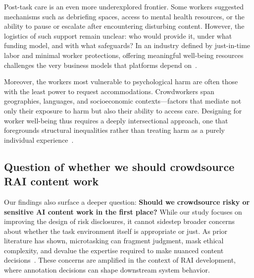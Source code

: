 Post-task care is an even more underexplored frontier. Some workers suggested mechanisms such as debriefing spaces, access to mental health resources, or the ability to pause or escalate after encountering disturbing content. However, the logistics of such support remain unclear: who would provide it, under what funding model, and with what safeguards? In an industry defined by just-in-time labor and minimal worker protections, offering meaningful well-being resources challenges the very business models that platforms depend on~\cite{gray2019ghost}.

Moreover, the workers most vulnerable to psychological harm are often those with the least power to request accommodations. Crowdworkers span geographies, languages, and socioeconomic contexts—factors that mediate not only their exposure to harm but also their ability to access care. Designing for worker well-being thus requires a deeply intersectional approach, one that foregrounds structural inequalities rather than treating harm as a purely individual experience~.

\subsection{Question of whether we should crowdsource RAI content work}

Our findings also surface a deeper question: \textbf{Should we crowdsource risky or sensitive AI content work in the first place?} While our study focuses on improving the design of risk disclosures, it cannot sidestep broader concerns about whether the task environment itself is appropriate or just. As prior literature has shown, microtasking can fragment judgment, mask ethical complexity, and devalue the expertise required to make nuanced content decisions~. These concerns are amplified in the context of RAI development, where annotation decisions can shape downstream system behavior.

